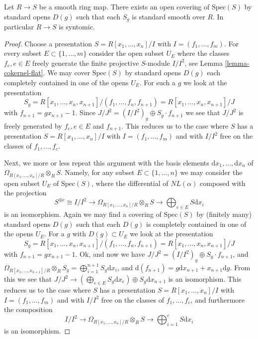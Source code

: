 \begin{lemma}
\label{lemma-smooth-syntomic}
Let $R \to S$ be a smooth ring map.
There exists an open covering of $\text{Spec}(S)$ by
standard opens $D(g)$ such that each $S_g$ is standard smooth
over $R$. In particular $R \to S$ is syntomic.
\end{lemma}

\begin{proof}
Choose a presentation $S = R[x_1, \ldots, x_n]/I$
with $I = (f_1, \ldots, f_m)$. For every subset
$E \subset \{1, \ldots, m\}$ consider the open
subset $U_E$ where the classes $f_e, e\in E$ freely generate
the finite projective $S$-module $I/I^2$, see Lemma \ref{lemma-cokernel-flat}.
We may cover $\text{Spec}(S)$ by standard opens $D(g)$ each
completely contained in one of the opens $U_E$. For such a $g$
we look at the presentation
$$
S_g =
R[x_1, \ldots, x_n, x_{n + 1}]/(f_1, \ldots, f_n, f_{n + 1}) =
R[x_1, \ldots, x_n, x_{n + 1}]/J
$$
with $f_{n + 1} = g x_{n + 1} - 1$. Since
$J/J^2 = (I/I^2)_g \oplus S_g \cdot f_{n + 1}$
we see that $J/J^2$ is freely generated by $f_e, e \in E$ and $f_{n + 1}$.
This reduces us to the case where $S$ has a presentation
$S = R[x_1, \ldots, x_n]/I$ with $I = (f_1, \ldots, f_m)$ and
with $I/I^2$ free on the classes of $f_1, \ldots, f_c$. 

\medskip\noindent
Next, we more or less repeat this argument with
the basis elements $\text{d}x_1, \ldots, \text{d}x_n$
of $\Omega_{R[x_1, \ldots, x_n]/R} \otimes_R S$.
Namely, for any subset $E \subset \{1, \ldots, n\}$ we may
consider the open subset $U_E$ of $\text{Spec}(S)$, where
the differential of $NL(\alpha)$ composed with the projection
$$
S^{\oplus c} \cong I/I^2
\longrightarrow
\Omega_{R[x_1, \ldots, x_n]/R} \otimes_R S
\longrightarrow
\bigoplus\nolimits_{e \in E} S\text{d}x_i
$$
is an isomorphism. Again we may find a covering of $\text{Spec}(S)$
by (finitely many) standard opens $D(g)$ such that each $D(g)$
is completely contained in one of the opens $U_E$.
For a $g$ with $D(g) \subset U_E$ we look at the presentation
$$
S_g =
R[x_1, \ldots, x_n, x_{n + 1}]/(f_1, \ldots, f_n, f_{n + 1}) =
R[x_1, \ldots, x_n, x_{n + 1}]/J
$$
with $f_{n + 1} = g x_{n + 1} - 1$. Ok, and now we have
$J/J^2 = (I/I^2)_g \oplus S_g \cdot f_{n + 1}$, and
$\Omega_{R[x_1, \ldots, x_{n + 1}]/R} \otimes_R S_g =
\bigoplus_{i = 1}^{n + 1} S_g \text{d}x_i$, and
$\text{d}(f_{n + 1}) = g \text{d}x_{n + 1} + x_{n + 1} \text{d} g$.
From this  we see that
$J/J^2 \to (\bigoplus_{e \in E} S_g \text{d}x_e) \oplus S_g \text{d}x_{n + 1}$
is an isomorphism.
This reduces us to the case where $S$ has a presentation
$S = R[x_1, \ldots, x_n]/I$ with $I = (f_1, \ldots, f_m)$ and
with $I/I^2$ free on the classes of $f_1, \ldots, f_c$,
and furthermore the composition
$$
I/I^2
\longrightarrow
\Omega_{R[x_1, \ldots, x_n]/R} \otimes_R S
\longrightarrow
\bigoplus\nolimits_{i = 1}^c S\text{d}x_i
$$
is an isomorphism.


\end{proof}

